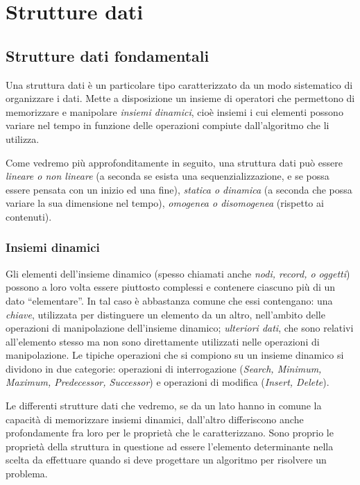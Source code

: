 \part{Strutture dati}

\chapter{Strutture dati fondamentali}
Una struttura dati è un particolare tipo caratterizzato da un modo sistematico di organizzare i dati. Mette a disposizione un insieme di operatori che permettono di memorizzare e manipolare \textit{insiemi dinamici}, cioè insiemi i cui elementi possono variare nel tempo in funzione delle operazioni compiute dall'algoritmo che li utilizza. 

Come vedremo più approfonditamente in seguito, una struttura dati può essere \textit{lineare o non lineare} (a seconda se esista una sequenzializzazione, e se possa essere pensata con un inizio ed una fine), \textit{statica o dinamica} (a seconda che possa variare la sua dimensione nel tempo), \textit{omogenea o disomogenea} (rispetto ai contenuti).

\section*{Insiemi dinamici}
Gli elementi dell'insieme dinamico (spesso chiamati anche \textit{nodi, record, o oggetti}) possono a loro volta essere piuttosto complessi e contenere ciascuno più di un dato “elementare”. In tal caso è abbastanza comune che essi contengano: una \textit{chiave}, utilizzata per distinguere un elemento da un altro, nell’ambito delle operazioni di manipolazione dell'insieme dinamico; \textit{ulteriori dati}, che sono relativi all’elemento stesso ma non sono direttamente utilizzati nelle operazioni di manipolazione. Le tipiche operazioni che si compiono su un insieme dinamico si dividono in due categorie: operazioni di interrogazione (\textit{Search, Minimum, Maximum, Predecessor, Successor}) e operazioni di modifica (\textit{Insert, Delete}).

Le differenti strutture dati che vedremo, se da un lato hanno in comune la capacità di memorizzare insiemi dinamici, dall’altro differiscono anche
profondamente fra loro per le proprietà che le caratterizzano. Sono proprio le proprietà della struttura in questione ad essere l’elemento determinante nella scelta da effettuare quando si deve progettare un algoritmo per risolvere un problema.

